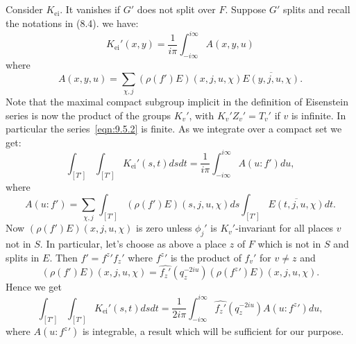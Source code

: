 \subsection{}
Consider $K_{\mathrm{ei}}$.
It vanishes if $G'$ does not split over $F$.
Suppose $G'$ splits and recall the notations in (8.4).
we have:
\begin{equation}
    K_{\mathrm{ei}}'(x, y) = \frac{1}{i\pi} \int_{-i\infty}^{i\infty} A(x, y, u)
\end{equation}
where
\begin{equation}\label{eqn:9.5.2}
    A(x, y, u) = \sum_{\chi, j} (\rho(f')E)(x, j, u, \chi) \overline{E(y, j, u, \chi)}.
\end{equation}
Note that the maximal compact subgroup implicit in the definition of Eisenstein series is now the product of the groups $K_v'$, with $K_v' Z_v' =T_v'$ if $v$ is infinite.
In particular the series~\eqref{eqn:9.5.2} is finite.
As we integrate over a compact set we get:
\begin{equation}
    \int_{[T']}\int_{[T']} K_{\mathrm{ei}}'(s, t)dsdt = \frac{1}{i\pi} \int_{-i\infty}^{i\infty} A(u:f') du,
\end{equation}
where
\begin{equation}
    A(u:f') = \sum_{\chi, j} \int_{[T']} (\rho(f')E)(s, j, u,\chi)ds \int_{[T']} \overline{E(t, j, u, \chi)} dt.
\end{equation}
Now $(\rho(f')E)(x, j, u, \chi)$ is zero unless $\phi_j'$ is $K_v'$-invariant for all places $v$ not in $S$.
In particular, let's choose as above a place $z$ of $F$ which is not in $S$ and splits in $E$.
Then $f' =f^{z}{'} f_{z}'$ where $f^{z}{'}$ is the product of $f_v'$ for $v\neq z$ and
\begin{equation}
    (\rho(f')E)(x, j, u, \chi) = \hat{f_z'} (q_z^{-2iu}) (\rho(f^z{'})E)(x, j, u, \chi).
\end{equation}
Hence we get
\begin{equation}
    \int_{[T']}\int_{[T']} K_{\mathrm{ei}}'(s, t)dsdt = \frac{1}{2i\pi} \int_{-i\infty}^{i\infty} \hat{f_z'}(q_{z}^{-2iu}) A(u:f^z{'}) du,
\end{equation}
where $A(u:f^z{'})$ is integrable, a result which will be sufficient for our purpose.